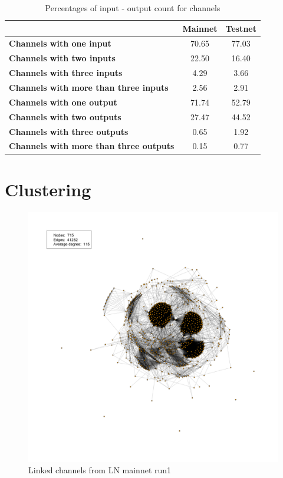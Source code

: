\begin{table}[]
\centering
\caption{Percentages of input - output count for channels}
\label{channel_input_output}
\begin{tabular}{|l|c|c|}
\hline
                                                                     & \textbf{Mainnet} & \textbf{Testnet} \\ \hline
\textbf{Channels with one input}             & 70.65            & 77.03            \\ \hline
\textbf{Channels with two inputs}            & 22.50            & 16.40            \\ \hline
\textbf{Channels with three inputs}          & 4.29             & 3.66             \\ \hline
\textbf{Channels with more than three inputs} & 2.56             & 2.91             \\ \hline
\textbf{Channels with one output}             & 71.74            & 52.79            \\ \hline
\textbf{Channels with two outputs}             & 27.47            & 44.52            \\ \hline
\textbf{Channels with three outputs}          & 0.65             & 1.92             \\ \hline
\textbf{Channels with more than three outputs} & 0.15             & 0.77             \\ \hline
\end{tabular}
\end{table}

\section{Clustering}

\begin{figure}[h]
    \centering
    \includegraphics[width=14cm]{figures/graphs/cg_ln_mainnet_run1.png}
    \caption{Linked channels from LN mainnet run1}
    \label{fig:channelGraphLNTS}
\end{figure}

